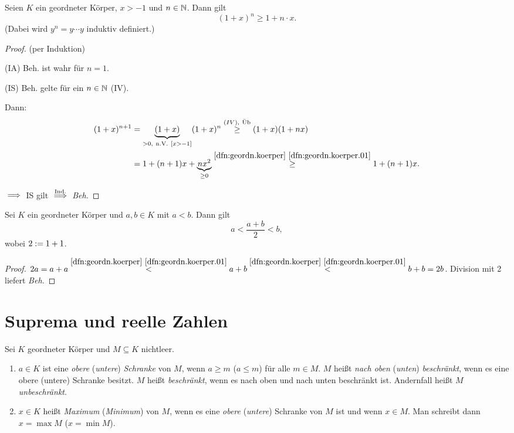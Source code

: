 \documentclass[12pt]{scrreprt}
\begin{document}
\begin{satz} \label{satz:bernoulli}

Seien $K$ ein geordneter Körper, $x > -1$ und $n\in\mathbb{N}$. Dann gilt
\[(1+x)^n \geq 1+n\cdot x.\]
(Dabei wird $y^n = y\dotsm y$ induktiv definiert.)
\end{satz}

\begin{proof}\label{bew:bernoulli}(per Induktion)

(IA) Beh. ist wahr für $n=1$.

(IS) Beh. gelte für ein $n\in\mathbb{N}$ (IV).

Dann: 
\begin{align}(1+x)^{n+1} &= \underbrace{(1+x)}_{>0\mathrm{,\ n.V.\ }[x>-1]}(1+x)^n \stackrel{(IV),\ \mathrm{\ddot{U}b}}{\geq} (1+x)(1+nx)\nonumber\\
&= 1 + (n+1)x + \underbrace{nx^2}_{\geq 0} \stackrel{\ref{dfn:geordn.koerper}~\ref{dfn:geordn.koerper.01}}{\geq} 1+(n+1)x.\nonumber
\end{align}

$\implies$ IS gilt $\stackrel{\mathrm{Ind.}}{\implies}$ \emph{Beh.}
\end{proof}

\begin{lem}\label{lem:zahlen.mitte}
Sei $K$ ein geordneter Körper und $a,b\in K$ mit $a<b$. Dann gilt
\[a < \frac{a+b}{2} < b,\] wobei $2:= 1+1$.
\end{lem}

\begin{proof}
$2a = a+a \stackrel{\ref{dfn:geordn.koerper}~\ref{dfn:geordn.koerper.01}}{<} a+b \stackrel{\ref{dfn:geordn.koerper}~\ref{dfn:geordn.koerper.01}}{<} b+b = 2b$. Division mit 2 liefert \emph{Beh.}
\end{proof}

\section{Suprema und reelle Zahlen}\label{sec:zahlen.suprema}

\begin{dfn}\label{dfn:zahlen.schranken}
Sei $K$ geordneter Körper und $M \subseteq K$ nichtleer.
\begin{enumerate} %
\item $a\in K$ ist eine \emph{obere} (\emph{untere}) \emph{Schranke} von $M$, wenn $a \geq m$ ($a \leq m$) für alle $m\in M$. $M$ heißt \emph{nach oben} (\emph{unten}) \emph{beschränkt}, wenn es eine obere (untere) Schranke besitzt. $M$ heißt \emph{beschränkt}, wenn es nach oben und nach unten beschränkt ist. Andernfall heißt $M$ \emph{unbeschränkt}.

\item $x\in K$ heißt \emph{Maximum} (\emph{Minimum}) von $M$, wenn es eine \emph{obere} (\emph{untere}) Schranke von $M$ ist und wenn $x\in M$. Man schreibt dann $x = \max M$ ($x=\min M$).
\end{enumerate}
\end{dfn}
\end{document}
